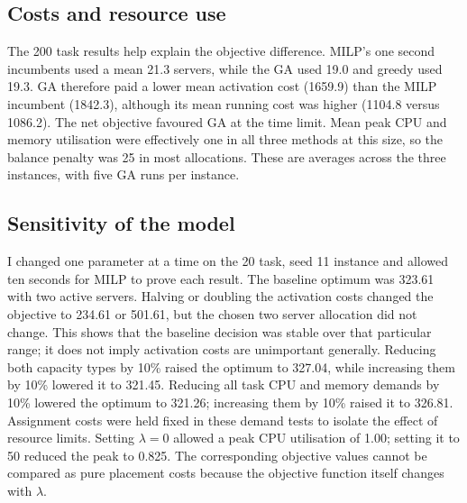 \documentclass[10pt,a4paper]{article}
\begin{document}
\subsection{Costs and resource use}

The 200 task results help explain the objective difference. MILP's one second
incumbents used a mean 21.3 servers, while the GA used 19.0 and greedy used
19.3. GA therefore paid a lower mean activation cost (1659.9) than the MILP
incumbent (1842.3), although its mean running cost was higher (1104.8 versus
1086.2). The net objective favoured GA at the time limit. Mean peak CPU and
memory utilisation were effectively one in all three methods at this size, so
the balance penalty was 25 in most allocations. These are averages across the
three instances, with five GA runs per instance.

\subsection{Sensitivity of the model}\label{sec:model-sensitivity}

I changed one parameter at a time on the 20 task, seed 11 instance and allowed
ten seconds for MILP to prove each result. The baseline optimum was 323.61 with
two active servers. Halving or doubling the activation costs changed the
objective to 234.61 or 501.61, but the chosen two server allocation did not
change. This shows that the baseline decision was stable over that particular
range; it does not imply activation costs are unimportant generally. Reducing
both capacity types by 10\% raised the optimum to 327.04, while increasing them
by 10\% lowered it to 321.45. Reducing all task CPU and memory demands by
10\% lowered the optimum to 321.26; increasing them by 10\% raised it to
326.81. Assignment costs were held fixed in these demand tests to isolate the
effect of resource limits. Setting $\lambda=0$ allowed a peak CPU
utilisation of 1.00; setting it to 50 reduced the peak to 0.825. The
corresponding objective values cannot be compared as pure placement costs
because the objective function itself changes with $\lambda$.
\end{document}
